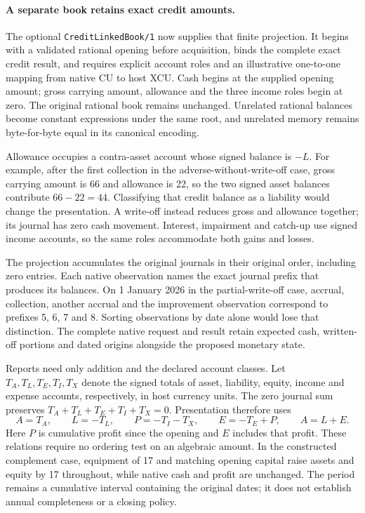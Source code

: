 \paragraph{A separate book retains exact credit amounts.}
The optional \texttt{CreditLinkedBook/1} now supplies that finite projection.
It begins with a validated rational opening before acquisition, binds the
complete exact credit result, and requires explicit account roles and an
illustrative one-to-one mapping from native CU to host XCU. Cash begins at
the supplied opening amount; gross carrying amount, allowance and the three
income roles begin at zero. The original rational book remains unchanged.
Unrelated rational balances become constant expressions under the same root,
and unrelated memory remains byte-for-byte equal in its canonical encoding.

Allowance occupies a contra-asset account whose signed balance is $-L$.
For example, after the first collection in the adverse-without-write-off case,
gross carrying amount is 66 and allowance is 22, so the two signed asset
balances contribute $66-22=44$. Classifying that credit balance as a liability
would change the presentation. A write-off instead reduces gross and allowance
together; its journal has zero cash movement. Interest, impairment and catch-up
use signed income accounts, so the same roles accommodate both gains and losses.

The projection accumulates the original journals in their original order,
including zero entries. Each native observation names the exact journal prefix
that produces its balances. On 1 January 2026 in the partial-write-off case,
accrual, collection, another accrual and the improvement observation correspond
to prefixes 5, 6, 7 and 8. Sorting observations by date alone would lose that
distinction. The complete native request and result retain expected cash,
written-off portions and dated origins alongside the proposed monetary state.

Reports need only addition and the declared account classes. Let $T_A,T_L,T_E,
T_I,T_X$ denote the signed totals of asset, liability, equity, income and expense
accounts, respectively, in host currency units. The zero journal sum preserves
$T_A+T_L+T_E+T_I+T_X=0$. Presentation therefore uses
\[
 A=T_A,\qquad L=-T_L,\qquad
 P=-T_I-T_X,\qquad E=-T_E+P,\qquad A=L+E.
\]
Here $P$ is cumulative profit since the opening and $E$ includes that profit.
These relations require no ordering test on an algebraic amount. In the
constructed complement case, equipment of 17 and matching opening capital
raise assets and equity by 17 throughout, while native cash and profit are
unchanged. The period remains a cumulative interval containing the original
dates; it does not establish annual completeness or a closing policy.

